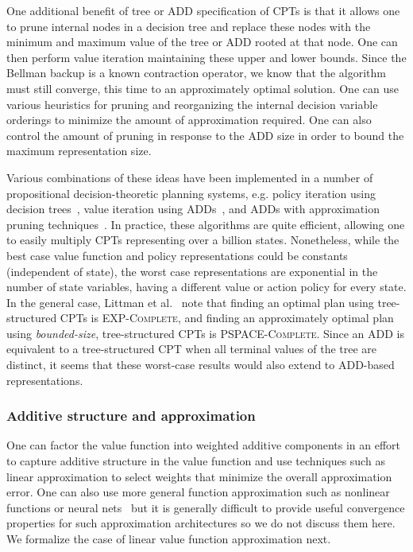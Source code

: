 One additional benefit of tree or ADD specification of CPTs is that it
allows one to prune internal nodes in a decision tree and replace
these nodes with the minimum and maximum value of the tree or ADD
rooted at that node.  One can then perform value iteration maintaining
these upper and lower bounds.  Since the Bellman backup is a known
contraction operator, we know that the algorithm must still converge,
this time to an approximately optimal solution.  One can use various
heuristics for pruning and reorganizing the internal decision variable
orderings to minimize the amount of approximation required.  One can
also control the amount of pruning in response to the ADD size in
order to bound the maximum representation size.

Various combinations of 
these ideas have been implemented in a number of propositional
decision-theoretic planning systems, e.g. policy iteration using
decision trees~\cite{spi}, value iteration using ADDs~\cite{spudd}, and ADDs with
approximation pruning techniques~\cite{apricodd}.
In practice, these algorithms are quite efficient, allowing one to easily
multiply CPTs representing over a billion states.  Nonetheless, while the
best case value function and policy representations could be constants (independent of state),
the worst case representations are exponential in the number of state variables, having a different
value or action policy for every state.
In the general case, Littman et al.~\cite{planexist}
note that finding an optimal plan using tree-structured CPTs is \textsc{EXP-Complete},
and finding an approximately optimal plan using \emph{bounded-size}, tree-structured CPTs
is \textsc{PSPACE-Complete}.  Since an ADD is equivalent to a tree-structured
CPT when all terminal values of the tree are distinct, it seems that
these worst-case results would also extend to ADD-based representations.

\subsubsection{Additive structure and approximation}

One can factor the value function into weighted additive components
in an effort to capture additive structure in the value function
and use techniques such as linear approximation to select
weights that minimize the overall approximation error.  One can
also use more general function approximation such as nonlinear
functions or neural nets~\cite{ndp} but it is generally difficult to
provide useful convergence properties for such approximation
architectures so we do not discuss them here.  We formalize the case of linear
value function approximation next.

